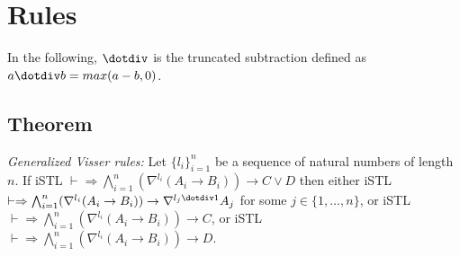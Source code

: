 \section{Rules} In the following, $\dotdiv$ is the truncated subtraction defined as $a \dotdiv b = max(a-b, 0)$.

\subsection{Theorem} \textit{Generalized Visser rules:} Let $\{ l_i \}_{i=1}^n$ be a sequence of natural numbers of length $n$. If {\small iSTL} $\vdash \Rightarrow \bigwedge_{i=1}^n (\nabla^{l_i} (A_i \rightarrow B_i)) \rightarrow C \lor D$ then either {\small iSTL} $\vdash \Rightarrow \bigwedge_{i=1}^n (\nabla^{l_i} (A_i \rightarrow B_i)) \rightarrow \nabla^{l_j \dotdiv 1} A_j$ for some $j \in \{ 1 , \dots , n \}$, or {\small iSTL} $\vdash \Rightarrow \bigwedge_{i=1}^n (\nabla^{l_i} (A_i \rightarrow B_i)) \rightarrow C$, or {\small iSTL} $\vdash \Rightarrow \bigwedge_{i=1}^n (\nabla^{l_i} (A_i \rightarrow B_i)) \rightarrow D$.

